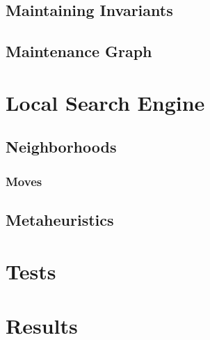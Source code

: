 \documentclass[a4paper,10pt]{article}
\begin{document}
\subsection{Maintaining Invariants}
\subsection{Maintenance Graph}
\section{Local Search Engine}
\subsection{Neighborhoods}
\subsubsection{Moves}
\subsection{Metaheuristics}
\section{Tests}
\section{Results}
\end{document}
